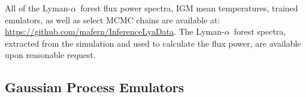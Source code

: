 \documentclass[a4paper,11pt]{article}
\newcommand{\lya}{Lyman-$\alpha$\ }
\begin{document}
All of the \lya forest flux power spectra, IGM mean temperatures, trained emulators, as well as select MCMC chains are available at: \url{https://github.com/mafern/InferenceLyaData}.
The \lya forest spectra, extracted from the simulation and used to calculate the flux power, are available upon reasonable request.
%
%





\subsection{Gaussian Process Emulators}\label{sec:gps}
\end{document}
